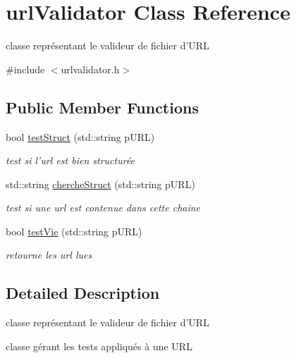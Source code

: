 \hypertarget{classurl_validator}{\section{url\-Validator Class Reference}
\label{classurl_validator}
}


classe représentant le valideur de fichier d'U\-R\-L  




{\ttfamily \#include $<$urlvalidator.\-h$>$}

\subsection*{Public Member Functions}
\begin{DoxyCompactItemize}
\item 
bool \hyperlink{classurl_validator_a337a9edaa44e76bda5a7ed3a345b0b78}{test\-Struct} (std\-::string p\-U\-R\-L)
\begin{DoxyCompactList}\small\item\em test si l'url est bien structurée \end{DoxyCompactList}\item 
std\-::string \hyperlink{classurl_validator_ad1db717c70226f9f78edfe07aa549152}{cherche\-Struct} (std\-::string p\-U\-R\-L)
\begin{DoxyCompactList}\small\item\em test si une url est contenue dans cette chaine \end{DoxyCompactList}\item 
bool \hyperlink{classurl_validator_a9993e82ddcaf00c655e3ad9221a10232}{test\-Vie} (std\-::string p\-U\-R\-L)
\begin{DoxyCompactList}\small\item\em retourne les url lues \end{DoxyCompactList}\end{DoxyCompactItemize}


\subsection{Detailed Description}
classe représentant le valideur de fichier d'U\-R\-L 

classe gérant les tests appliqués à une U\-R\-L 

